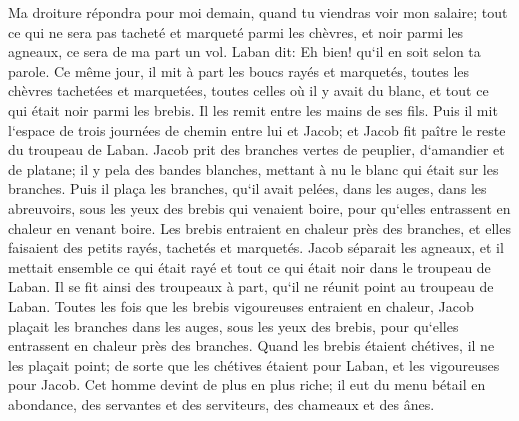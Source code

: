\verse Ma droiture répondra pour moi demain, quand tu viendras voir mon salaire; tout ce qui ne sera pas tacheté et marqueté parmi les chèvres, et noir parmi les agneaux, ce sera de ma part un vol. 
\verse Laban dit: Eh bien! qu`il en soit selon ta parole. 
\verse Ce même jour, il mit à part les boucs rayés et marquetés, toutes les chèvres tachetées et marquetées, toutes celles où il y avait du blanc, et tout ce qui était noir parmi les brebis. Il les remit entre les mains de ses fils. 
\verse Puis il mit l`espace de trois journées de chemin entre lui et Jacob; et Jacob fit paître le reste du troupeau de Laban. 
\verse Jacob prit des branches vertes de peuplier, d`amandier et de platane; il y pela des bandes blanches, mettant à nu le blanc qui était sur les branches. 
\verse Puis il plaça les branches, qu`il avait pelées, dans les auges, dans les abreuvoirs, sous les yeux des brebis qui venaient boire, pour qu`elles entrassent en chaleur en venant boire. 
\verse Les brebis entraient en chaleur près des branches, et elles faisaient des petits rayés, tachetés et marquetés. 
\verse Jacob séparait les agneaux, et il mettait ensemble ce qui était rayé et tout ce qui était noir dans le troupeau de Laban. Il se fit ainsi des troupeaux à part, qu`il ne réunit point au troupeau de Laban. 
\verse Toutes les fois que les brebis vigoureuses entraient en chaleur, Jacob plaçait les branches dans les auges, sous les yeux des brebis, pour qu`elles entrassent en chaleur près des branches. 
\verse Quand les brebis étaient chétives, il ne les plaçait point; de sorte que les chétives étaient pour Laban, et les vigoureuses pour Jacob. 
\verse Cet homme devint de plus en plus riche; il eut du menu bétail en abondance, des servantes et des serviteurs, des chameaux et des ânes. 


